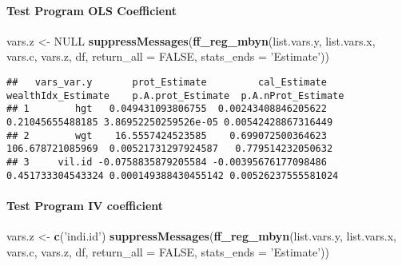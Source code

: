\documentclass[
]{book}
\newenvironment{Shaded}{\begin{snugshade}}{\end{snugshade}}
\newcommand{\DataTypeTok}[1]{\textcolor[rgb]{0.13,0.29,0.53}{#1}}
\newcommand{\KeywordTok}[1]{\textcolor[rgb]{0.13,0.29,0.53}{\textbf{#1}}}
\newcommand{\NormalTok}[1]{#1}
\newcommand{\OtherTok}[1]{\textcolor[rgb]{0.56,0.35,0.01}{#1}}
\newcommand{\StringTok}[1]{\textcolor[rgb]{0.31,0.60,0.02}{#1}}
\begin{document}
\hypertarget{test-program-ols-coefficient}{%
\paragraph{Test Program OLS Coefficient}\label{test-program-ols-coefficient}}

\begin{Shaded}
\begin{Highlighting}[]
\NormalTok{vars.z <-}\StringTok{ }\OtherTok{NULL}
\KeywordTok{suppressMessages}\NormalTok{(}\KeywordTok{ff_reg_mbyn}\NormalTok{(list.vars.y, list.vars.x,}
\NormalTok{                             vars.c, vars.z, df,}
                             \DataTypeTok{return_all =} \OtherTok{FALSE}\NormalTok{,}
                             \DataTypeTok{stats_ends =} \StringTok{'Estimate'}\NormalTok{))}
\end{Highlighting}
\end{Shaded}

\begin{verbatim}
##   vars_var.y       prot_Estimate         cal_Estimate wealthIdx_Estimate    p.A.prot_Estimate  p.A.nProt_Estimate
## 1        hgt   0.049431093806755  0.00243408846205622   0.21045655488185 3.86952250259526e-05 0.00542428867316449
## 2        wgt    16.5557424523585    0.699072500364623   106.678721085969  0.00521731297924587   0.779514232050632
## 3     vil.id -0.0758835879205584 -0.00395676177098486  0.451733304543324 0.000149388430455142 0.00526237555581024
\end{verbatim}

\hypertarget{test-program-iv-coefficient}{%
\paragraph{Test Program IV coefficient}\label{test-program-iv-coefficient}}

\begin{Shaded}
\begin{Highlighting}[]
\NormalTok{vars.z <-}\StringTok{ }\KeywordTok{c}\NormalTok{(}\StringTok{'indi.id'}\NormalTok{)}
\KeywordTok{suppressMessages}\NormalTok{(}\KeywordTok{ff_reg_mbyn}\NormalTok{(list.vars.y, list.vars.x,}
\NormalTok{                             vars.c, vars.z, df,}
                             \DataTypeTok{return_all =} \OtherTok{FALSE}\NormalTok{,}
                             \DataTypeTok{stats_ends =} \StringTok{'Estimate'}\NormalTok{))}
\end{Highlighting}
\end{Shaded}
\end{document}
